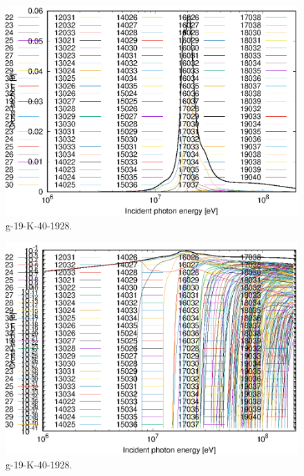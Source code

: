 \begin{figure}
 \includegraphics[width=\linewidth]{eps/g_19-K-40_1928.eps}
  \caption{g-19-K-40-1928.}
\end{figure}
\begin{figure}
 \includegraphics[width=\linewidth]{eps-log/g_19-K-40_1928.eps}
 \caption{g-19-K-40-1928.}
\end{figure}
\newpage \clearpage

